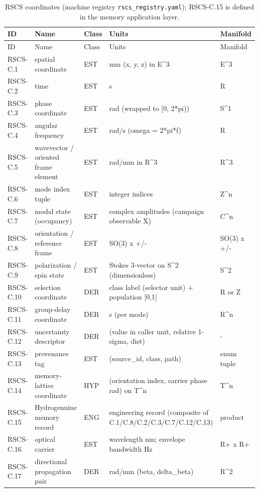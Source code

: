 \begin{longtable}{@{}l p{4.2cm} l p{4.6cm} l@{}}
\caption{RSCS coordinates (machine registry \texttt{rscs\_registry.yaml}); RSCS-C.15 is defined in the memory application layer.}\label{tab:coords}\\
\toprule ID & Name & Class & Units & Manifold \\ \midrule
\endfirsthead
\toprule ID & Name & Class & Units & Manifold \\ \midrule
\endhead
RSCS-C.1 & spatial coordinate & EST & mm (x, y, z) in E\^{}3 & E\^{}3 \\
RSCS-C.2 & time & EST & s & R \\
RSCS-C.3 & phase coordinate & EST & rad (wrapped to [0, 2*pi)) & S\^{}1 \\
RSCS-C.4 & angular frequency & EST & rad/\allowbreak{}s (omega = 2*pi*f) & R \\
RSCS-C.5 & wavevector / oriented frame element & EST & rad/\allowbreak{}mm in R\^{}3 & R\^{}3 \\
RSCS-C.6 & mode index tuple & EST & integer indices & Z\^{}n \\
RSCS-C.7 & modal state (occupancy) & EST & complex amplitudes (campaign observable X) & C\^{}n \\
RSCS-C.8 & orientation / reference frame & EST & SO(3) x {+/\allowbreak{}-} & SO(3) x {+/-} \\
RSCS-C.9 & polarization / spin state & EST & Stokes 3-vector on S\^{}2 (dimensionless) & S\^{}2 \\
RSCS-C.10 & selection coordinate & DER & class label (selector unit) + population [0,1] & R or Z \\
RSCS-C.11 & group-delay coordinate & DER & s (per mode) & R\^{}n \\
RSCS-C.12 & uncertainty descriptor & DER & (value in caller unit, relative 1-sigma, dist) & - \\
RSCS-C.13 & provenance tag & EST & (source\_id, class, path) & enum tuple \\
RSCS-C.14 & memory-lattice coordinate & HYP & (orientation index, carrier phase rad) on T\^{}n & T\^{}n \\
RSCS-C.15 & Hydrogenuine memory record & ENG & engineering record (composite of C.1/\allowbreak{}C.8/\allowbreak{}C.2/\allowbreak{}C.3/\allowbreak{}C.7/\allowbreak{}C.12/\allowbreak{}C.13) & product \\
RSCS-C.16 & optical carrier & EST & wavelength nm; envelope bandwidth Hz & R+ x R+ \\
RSCS-C.17 & directional propagation pair & DER & rad/\allowbreak{}mm (beta, delta\_beta) & R\^{}2 \\
\bottomrule
\end{longtable}
